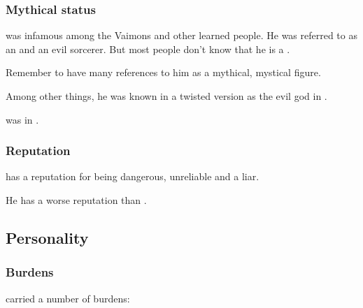 \subsubsection{Mythical status}
\Ishnaruchaefir{} was infamous among the Vaimons and other learned people. 
He was referred to as an  and an evil \chaos{} sorcerer. 
But most people don't know that he is a \dragon. 

Remember to have many references to him as a mythical, mystical figure. 

Among other things, he was known in a twisted version as the evil god  in .

\Ishnaruchaefir was  in .





\subsubsection{Reputation}
\Ishnaruchaefir{} has a reputation for being dangerous, unreliable and a liar. 

He has a worse reputation than . 










\subsection{Personality}





\subsubsection{Burdens}
\Ishnaruchaefir carried a number of burdens:

